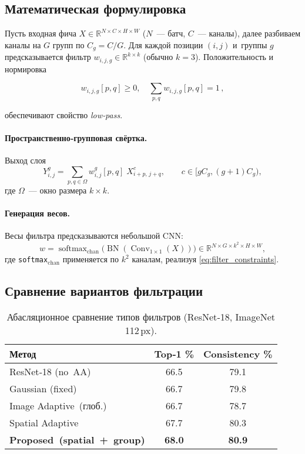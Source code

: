 \subsection{Математическая формулировка}
\label{sec:aa_math}

Пусть входная фича $X\in\mathbb R^{N\times C\times H\times W}$ 
($N$ — батч, $C$ — каналы), далее разбиваем каналы на $G$ групп по $C_g=C/G$.
Для каждой позиции $(i,j)$ и группы $g$ предсказывается фильтр
$w_{i,j,g}\in\mathbb R^{k\times k}$ (обычно $k=3$). Положительность и нормировка

\begin{equation}
 w_{i,j,g}[p,q] \ge 0, \quad \sum_{p,q} w_{i,j,g}[p,q] = 1\,,
 \label{eq:filter_constraints}
\end{equation}

обеспечивают свойство \emph{low‑pass}.

\paragraph{Пространственно‑групповая свёртка.} 
Выход слоя
\begin{equation}
Y^{g}_{i,j}=\sum_{p,q\in\Omega} w^{g}_{i,j}[p,q] 
              \; X^{c}_{i+p,\,j+q},
\qquad c\in\bigl[gC_g,(g+1)C_g\bigr),
\label{eq:spatial_group_conv}
\end{equation}
где $\Omega$ — окно размера $k\times k$.

\paragraph{Генерация весов.} Весы фильтра предсказываются небольшой CNN:
\begin{equation}
 w = \operatorname{softmax}_\text{chan}\bigl(\operatorname{BN}(\operatorname{Conv}_{1\times1}(X))\bigr)
 \in \mathbb R^{N\times G\times k^2\times H\times W},
\label{eq:weight_pred}
\end{equation}
где \texttt{softmax}\(_\text{chan}\) применяется по $k^2$ каналам, реализуя
\eqref{eq:filter_constraints}.

\subsection{Сравнение вариантов фильтрации}

\begin{table}[t]
  \centering
  \caption{Абасляционное сравнение типов фильтров (ResNet‑18, ImageNet 112\,px).}
  \label{tab:ablation_filters}
  \begin{tabular}{@{}lcc@{}}
    \toprule
    \textbf{Метод} & Top‑1 \% & Consistency \% \\
    \midrule
    ResNet‑18 (no AA) & 66.5 & 79.1 \\
    Gaussian (fixed) & 66.7 & 79.8 \\
    Image Adaptive (глоб.) & 66.7 & 78.7 \\
    Spatial Adaptive & 67.7 & 80.3 \\
    \textbf{Proposed (spatial + group)} & \textbf{68.0} & \textbf{80.9} \\
    \bottomrule
  \end{tabular}
\end{table}

